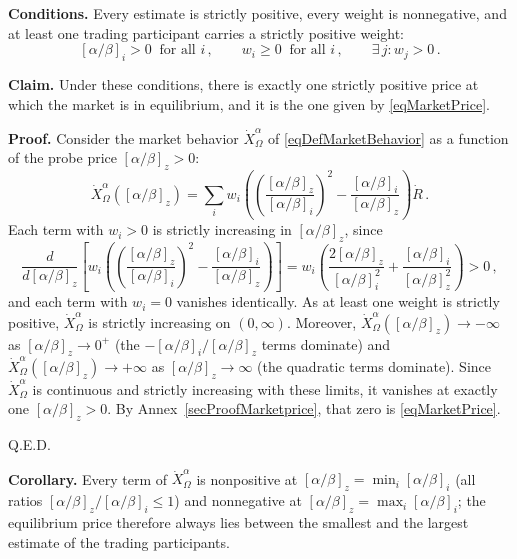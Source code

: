 \documentclass[letterpaper]{article}
\newcommand{\priceAB}{\left[\alpha / \beta\right]}
\begin{document}
\textbf{Conditions.} Every estimate is strictly positive, every weight is nonnegative, and at least one trading participant carries a strictly positive weight:
\begin{equation*}
    \priceAB_i > 0 \ \text{ for all } i\,, \qquad w_i \geq 0 \ \text{ for all } i\,, \qquad \exists\, j: w_j > 0\,.
\end{equation*}

\textbf{Claim.} Under these conditions, there is exactly one strictly positive price at which the market is in equilibrium, and it is the one given by \eqref{eqMarketPrice}.

\textbf{Proof.} Consider the market behavior $\dot{X}_\Omega^\alpha$ of \eqref{eqDefMarketBehavior} as a function of the probe price $\priceAB_z > 0$:
\begin{equation*}
    \dot{X}_\Omega^\alpha(\priceAB_z) = \sum_i w_i \left( \left(\frac{\priceAB_z}{\priceAB_i}\right)^2 - \frac{\priceAB_i}{\priceAB_z} \right) \dot{R}\,.
\end{equation*}
Each term with $w_i > 0$ is strictly increasing in $\priceAB_z$, since
\begin{equation*}
    \frac{d}{d\priceAB_z}\left[ w_i \left( \left(\frac{\priceAB_z}{\priceAB_i}\right)^2 - \frac{\priceAB_i}{\priceAB_z} \right) \right] = w_i \left( \frac{2\priceAB_z}{\priceAB_i^2} + \frac{\priceAB_i}{\priceAB_z^2} \right) > 0\,,
\end{equation*}
and each term with $w_i = 0$ vanishes identically. As at least one weight is strictly positive, $\dot{X}_\Omega^\alpha$ is strictly increasing on $(0, \infty)$. Moreover, $\dot{X}_\Omega^\alpha(\priceAB_z) \to -\infty$ as $\priceAB_z \to 0^+$ (the $-\priceAB_i/\priceAB_z$ terms dominate) and $\dot{X}_\Omega^\alpha(\priceAB_z) \to +\infty$ as $\priceAB_z \to \infty$ (the quadratic terms dominate). Since $\dot{X}_\Omega^\alpha$ is continuous and strictly increasing with these limits, it vanishes at exactly one $\priceAB_z > 0$. By Annex~\ref{secProofMarketprice}, that zero is \eqref{eqMarketPrice}.
\begin{flushright}
Q.E.D.
\end{flushright}

\textbf{Corollary.} Every term of $\dot{X}_\Omega^\alpha$ is nonpositive at $\priceAB_z = \min_i \priceAB_i$ (all ratios $\priceAB_z/\priceAB_i \leq 1$) and nonnegative at $\priceAB_z = \max_i \priceAB_i$; the equilibrium price therefore always lies between the smallest and the largest estimate of the trading participants.
\end{document}
